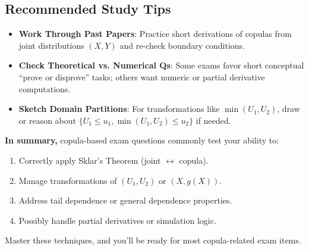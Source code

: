 \documentclass[13pt,a4paper]{article}
\begin{document}
\subsection{Recommended Study Tips}
\begin{itemize}
  \item \textbf{Work Through Past Papers}: Practice short derivations of copulas from joint distributions \((X,Y)\) and re-check boundary conditions.
  \item \textbf{Check Theoretical vs. Numerical Qs}: Some exams favor short conceptual “prove or disprove” tasks; others want numeric or partial derivative computations.
  \item \textbf{Sketch Domain Partitions}: For transformations like \(\min(U_1,U_2)\), draw or reason about \(\{U_1\le u_1,\min(U_1,U_2)\le u_2\}\) if needed.
\end{itemize}

\noindent
\textbf{In summary,} copula-based exam questions commonly test your ability to:
\begin{enumerate}
  \item Correctly apply Sklar’s Theorem (joint \(\leftrightarrow\) copula).
  \item Manage transformations of \((U_1,U_2)\) or \((X,g(X))\).
  \item Address tail dependence or general dependence properties.
  \item Possibly handle partial derivatives or simulation logic.
\end{enumerate}
Master these techniques, and you’ll be ready for most copula-related exam items.
\end{document}
